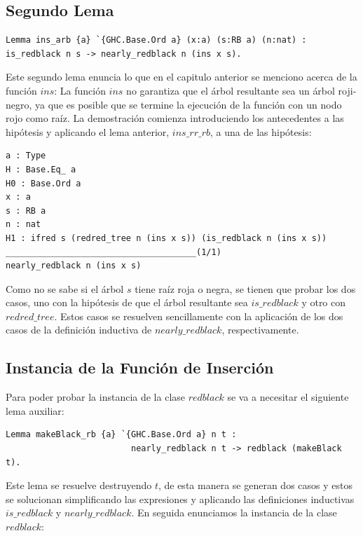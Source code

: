 \documentclass[8pt,leqno,pdflatex,spanish]{book}
\newcommand{\arn}{árbol roji-negro}
\theoremstyle{plain}
\theoremstyle{definition}
\theoremstyle{remark}
\begin{document}
\subsection{Segundo Lema}

\begin{verbatim}
Lemma ins_arb {a} `{GHC.Base.Ord a} (x:a) (s:RB a) (n:nat) : 
is_redblack n s -> nearly_redblack n (ins x s).
\end{verbatim}

Este segundo lema enuncia lo que en el capitulo anterior se menciono acerca de la funci\'on $ins$: 
La funci\'on $ins$ no garantiza que el \'arbol resultante sea un {\arn}, ya que es posible que se 
termine la ejecuci\'on de la funci\'on con un nodo rojo como raíz. La demostraci\'on comienza 
introduciendo los antecedentes a las hipótesis y aplicando el lema anterior, $ins\_rr\_rb$, a una 
de las hip\'otesis:

\begin{verbatim}
a : Type
H : Base.Eq_ a
H0 : Base.Ord a
x : a
s : RB a
n : nat
H1 : ifred s (redred_tree n (ins x s)) (is_redblack n (ins x s))
______________________________________(1/1)
nearly_redblack n (ins x s)

\end{verbatim}

Como no se sabe si el \'arbol $s$ tiene ra\'iz roja o negra, se tienen que probar los dos casos, 
uno con la hipótesis de que el \'arbol resultante sea $is\_redblack$ y otro con $redred\_tree$. 
Estos casos se resuelven sencillamente con la aplicación de los dos casos de la definici\'on 
inductiva de $nearly\_redblack$, respectivamente.

\subsection{Instancia de la Funci\'on de Inserci\'on}

Para poder probar la instancia de la clase $redblack$ se va a necesitar el siguiente lema auxiliar:

\begin{verbatim}
Lemma makeBlack_rb {a} `{GHC.Base.Ord a} n t : 
                         nearly_redblack n t -> redblack (makeBlack t).
\end{verbatim}

Este lema se resuelve destruyendo $t$, de esta manera se generan dos casos y estos se solucionan 
simplificando las expresiones y aplicando las definiciones inductivas $is\_redblack$ y 
$nearly\_redblack$.
En seguida enunciamos la instancia de la clase $redblack$:
\end{document}
